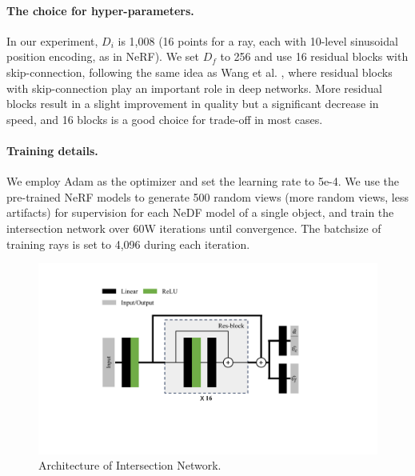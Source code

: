 \documentclass[letterpaper]{article} %
\begin{document}
\paragraph{The choice for hyper-parameters.} In our experiment, $D_i$ is 1,008 (16 points for a ray, each with 10-level sinusoidal position encoding, as in NeRF). We set $D_f$ to 256 and use 16 residual blocks with skip-connection, following the same idea as Wang et al. , where residual blocks with skip-connection play an important role in deep networks. More residual blocks result in a slight improvement in quality but a significant decrease in speed, and 16 blocks is a good choice for trade-off in most cases.

\paragraph{Training details.} We employ Adam as the optimizer and set the learning rate to 5e-4. We use the pre-trained NeRF models to generate 500 random views (more random views, less artifacts) for supervision for each NeDF model of a single object, and train the intersection network over 60W iterations until convergence. The batchsize of training rays is set to 4,096 during each iteration.

\begin{figure}[htbp]
    \centering
    \includegraphics[width=\linewidth]{figure/MLP_arch.pdf}
    \caption{Architecture of Intersection Network.}
    \label{fig:nedf_arch}
\end{figure}
\end{document}
